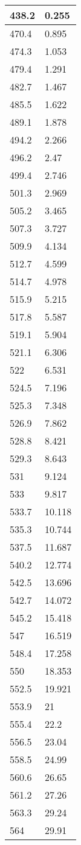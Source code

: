\begin{tabular}{|l|l|}
\hline
438.2&0.255\\\hline
470.4&0.895\\\hline
474.3&1.053\\\hline
479.4&1.291\\\hline
482.7&1.467\\\hline
485.5&1.622\\\hline
489.1&1.878\\\hline
494.2&2.266\\\hline
496.2&2.47\\\hline
499.4&2.746\\\hline
501.3&2.969\\\hline
505.2&3.465\\\hline
507.3&3.727\\\hline
509.9&4.134\\\hline
512.7&4.599\\\hline
514.7&4.978\\\hline
515.9&5.215\\\hline
517.8&5.587\\\hline
519.1&5.904\\\hline
521.1&6.306\\\hline
522&6.531\\\hline
524.5&7.196\\\hline
525.3&7.348\\\hline
526.9&7.862\\\hline
528.8&8.421\\\hline
529.3&8.643\\\hline
531&9.124\\\hline
533&9.817\\\hline
533.7&10.118\\\hline
535.3&10.744\\\hline
537.5&11.687\\\hline
540.2&12.774\\\hline
542.5&13.696\\\hline
542.7&14.072\\\hline
545.2&15.418\\\hline
547&16.519\\\hline
548.4&17.258\\\hline
550&18.353\\\hline
552.5&19.921\\\hline
553.9&21\\\hline
555.4&22.2\\\hline
556.5&23.04\\\hline
558.5&24.99\\\hline
560.6&26.65\\\hline
561.2&27.26\\\hline
563.3&29.24\\\hline
564&29.91\\\hline
\end{tabular}
